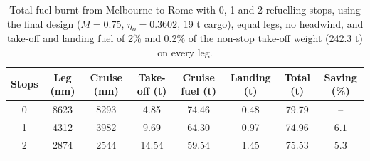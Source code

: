 \begin{table}[H]
\centering
\small
\setlength{\tabcolsep}{4pt}
\begin{tabular}{c c c c c c c c}
\toprule
Stops & Leg (nm) & Cruise (nm) & Take-off (t) & Cruise fuel (t) & Landing (t) & Total (t) & Saving (\%) \\
\midrule
0 & 8623 & 8293 & 4.85 & 74.46 & 0.48 & 79.79 & -- \\
1 & 4312 & 3982 & 9.69 & 64.30 & 0.97 & 74.96 & $6.1$ \\
2 & 2874 & 2544 & 14.54 & 59.54 & 1.45 & 75.53 & $5.3$ \\
\bottomrule
\end{tabular}
\caption{Total fuel burnt from Melbourne to Rome with 0, 1 and 2 refuelling stops, using the final design
($M = 0.75$, $\eta_o = 0.3602$, 19 t cargo), equal legs, no headwind, and take-off
and landing fuel of 2\% and 0.2\% of the non-stop take-off weight (242.3 t) on every leg.}
\label{tab:refuelling_stops}
\end{table}
